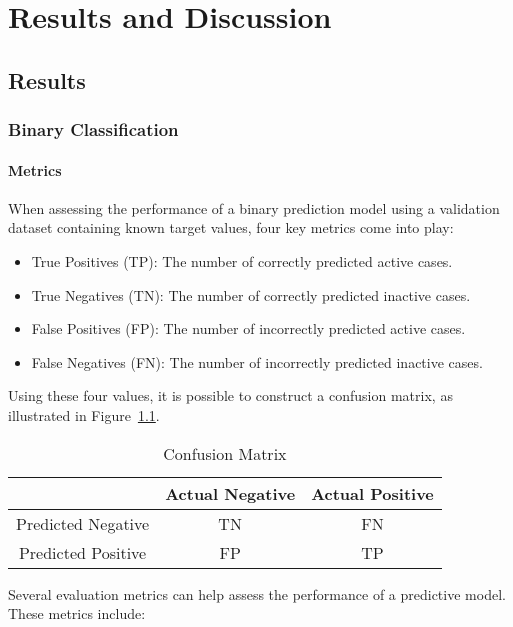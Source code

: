 \chapter{Results and Discussion}\label{chap:results_discussion}
\section{Results}
\subsection{Binary Classification}
\subsubsection{Metrics}
When assessing the performance of a binary prediction model using a validation dataset containing known target values, four key metrics come into play:

\begin{itemize}
  \item True Positives (TP): The number of correctly predicted active cases.
  \item True Negatives (TN): The number of correctly predicted inactive cases.
  \item False Positives (FP): The number of incorrectly predicted active cases.
  \item False Negatives (FN): The number of incorrectly predicted inactive cases.
\end{itemize}

Using these four values, it is possible to construct a confusion matrix, as illustrated in Figure~\ref{tab:confusion_matrix}.


\begin{table}[h]
  \centering
  \caption{Confusion Matrix}
  \label{tab:confusion_matrix}
  \setlength{\tabcolsep}{10pt} %
  \renewcommand{\arraystretch}{1.5} %
  \begin{tabular}{|c|c|c|}
  \cline{2-3}
  \multicolumn{1}{c|}{} & Actual Negative & Actual Positive \\
  \hline
  Predicted Negative & TN & FN \\
  \hline
  Predicted Positive & FP & TP \\
  \hline
  \end{tabular}
\end{table}


Several evaluation metrics can help assess the performance of a predictive model. These metrics include:

